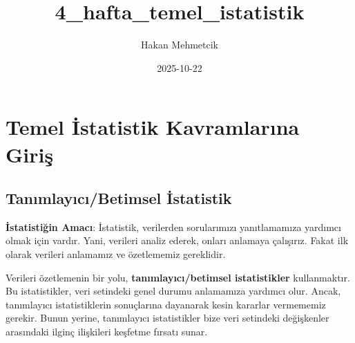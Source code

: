 \documentclass[
  letterpaper,
  DIV=11,
  numbers=noendperiod]{scrartcl}
\title{4\_hafta\_temel\_istatistik}
\author{Hakan Mehmetcik}
\date{2025-10-22}
\begin{document}
\maketitle
\ifdefined\Shaded\renewenvironment{Shaded}{\begin{tcolorbox}[enhanced, interior hidden, boxrule=0pt, breakable, borderline west={3pt}{0pt}{shadecolor}, frame hidden, sharp corners]}{\end{tcolorbox}}\fi

\hypertarget{temel-istatistik-kavramlarux131na-giriux15f}{%
\section{Temel İstatistik Kavramlarına
Giriş}\label{temel-istatistik-kavramlarux131na-giriux15f}}

\hypertarget{tanux131mlayux131cux131betimsel-istatistik}{%
\subsection{Tanımlayıcı/Betimsel
İstatistik}\label{tanux131mlayux131cux131betimsel-istatistik}}

\textbf{İstatistiğin Amacı}: İstatistik, verilerden sorularımızı
yanıtlamamıza yardımcı olmak için vardır. Yani, verileri analiz ederek,
onları anlamaya çalışırız. Fakat ilk olarak verileri anlamamız ve
özetlememiz gereklidir.

Verileri özetlemenin bir yolu, \textbf{tanımlayıcı/betimsel
istatistikler} kullanmaktır. Bu istatistikler, veri setindeki genel
durumu anlamamıza yardımcı olur. Ancak, tanımlayıcı istatistiklerin
sonuçlarına dayanarak kesin kararlar vermememiz gerekir. Bunun yerine,
tanımlayıcı istatistikler bize veri setindeki değişkenler arasındaki
ilginç ilişkileri keşfetme fırsatı sunar.
\end{document}
